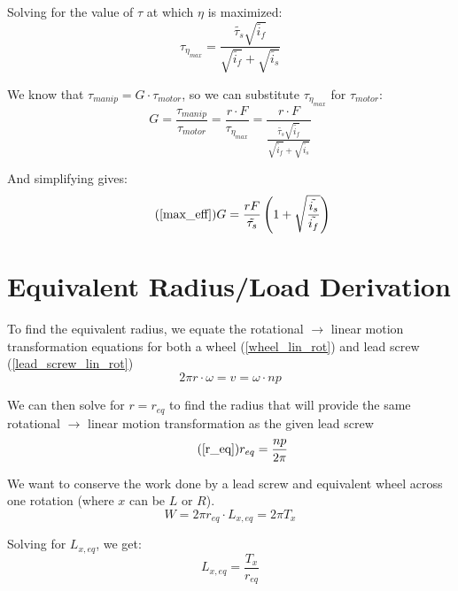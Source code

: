 \documentclass[11pt,a4paper,titlepage]{article}
\begin{document}
	Solving for the value of $\tau$ at which $\eta$ is maximized:
	\begin{equation}
		\tau_{\eta_{max}} = \frac{\tilde{\tau_s} \sqrt{\tilde{i_f}}}{\sqrt{\tilde{i_f}} + \sqrt{\tilde{i_s}}}
	\end{equation}
	
	We know that $\tau_{manip} = G \cdot \tau_{motor}$, so we can substitute $\tau_{\eta_{max}}$ for $\tau_{motor}$:
	\begin{equation}
		G = \frac{\tau_{manip}}{\tau_{motor}} = \frac{r \cdot F}{\tau_{\eta_{max}}} = \frac{r \cdot F}{\frac{\tilde{\tau_s} \sqrt{\tilde{i_f}}}{\sqrt{\tilde{i_f}} + \sqrt{\tilde{i_s}}}}
	\end{equation}
	
	And simplifying gives:
	\begin{equation} \tag{\ref*{max_eff}}
		G = \frac{r F}{\tilde{\tau_s}} \left( 1 + \sqrt{\frac{\tilde{i_s}}{\tilde{i_f}}} \right)
	\end{equation}
	
	\bigskip
	\section{Equivalent Radius/Load Derivation} \label{lead_radius_appendix}
	To find the equivalent radius, we equate the rotational $\to$ linear motion transformation equations for both a wheel (\ref{wheel_lin_rot}) and lead screw (\ref{lead_screw_lin_rot})
	\begin{equation}
		2 \pi r \cdot \omega = v = \omega \cdot n p
	\end{equation}
	
	We can then solve for $r = r_{eq}$ to find the radius that will provide the same rotational $\to$ linear motion transformation as the given lead screw
	\begin{equation} \tag{\ref*{r_eq}}
		r_{eq} = \frac{n p}{2 \pi}
	\end{equation}
	
	We want to conserve the work done by a lead screw and equivalent wheel across one rotation (where $x$ can be $L$ or $R$). 
	\begin{equation}
		W = 2 \pi r_{eq} \cdot L_{x,eq} = 2 \pi T_x
	\end{equation}
	
	Solving for $L_{x,eq}$, we get:
	\begin{equation}
		L_{x,eq} = \frac{T_x}{r_{eq}}
	\end{equation}
	
	\newpage
\end{document}
